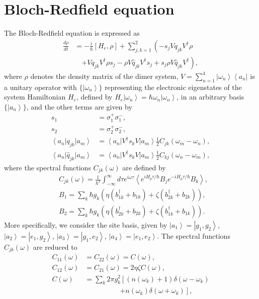 \documentclass[%
 reprint,%
 amssymb, amsmath,%
 aip,cha,%
]{revtex4-1}
\newcommand{\bra}[1]{\ensuremath{\left\langle{#1}\right\vert}}
\newcommand{\ket}[1]{\ensuremath{\left|{#1}\right\rangle}}
\begin{document}
\section{Bloch-Redfield equation}
 The Bloch-Redfield equation is expressed as
 \begin{align}
 \frac{d\rho}{dt}
 &=-\frac{i}{\hbar}[H_e,\rho]+\sum_{j,k=1}^{2}\left(-s_{j} V q_{jk} V^{\dagger} \rho\right.\label{eq:A1}\\
 &\quad\left.+V q_{jk} V^{\dagger} \rho s_{j} - \rho V \hat{q}_{jk} V^{\dagger} s_{j} + s_{j} \rho V \hat{q}_{jk} V^{\dagger}\right),\nonumber
 \end{align}
 where $\rho$ denotes the density matrix of the dimer system, $V=\sum_{n=1}^{4}\ket{\omega_n}\bra{a_n}$ is a unitary operator with $\{\ket{\omega_n}\}$ representing the electronic eigenstates of the system Hamiltonian $H_e$, defined by $H_e\ket{\omega_n}=\hbar\omega_n\ket{\omega_n}$, in an arbitrary basis $\{\ket{a_n}\}$, and the other terms are given by
 \begin{align}
s_{1}&=\sigma_{1}^{+}\sigma^-_{1},\\
s_{2}&=\sigma_{2}^{+}\sigma^-_{2},\\
\bra{a_n}q_{jk}\ket{a_m} &=\bra{a_n}V^{\dagger}s_{k} V\ket{a_m}\frac{1}{2}C_{jk}(\omega_m-\omega_n),\label{eq:A4}\\
\bra{a_n}\hat{q}_{jk}\ket{a_m} &=\bra{a_n}V^{\dagger}s_{k} V\ket{a_m}\frac{1}{2}C_{kj}(\omega_n-\omega_m),\label{eq:A5}
 \end{align}
 where the spectral functions $C_{jk}(\omega)$ are defined by
 \begin{align}
 &C_{jk}(\omega)=\frac{1}{\hbar^{2}}\int_{-\infty}^{\infty}d\tau e^{i\omega\tau}\left\langle e^{iH_{p}\tau/\hbar}B_{j}e^{-iH_{p}\tau/\hbar}B_{k} \right\rangle,\\
 &B_{1}=\sum_{k}\hbar g_{k}(\eta(b_{1k}^{\dagger}+b_{1k})+\zeta(b_{2k}^{\dagger}+b_{2k})),\\
 &B_{2}=\sum_{k}\hbar g_{k}(\eta(b_{2k}^{\dagger}+b_{2k})+\zeta(b_{1k}^{\dagger}+b_{1k})).
 \end{align}
 More specifically, we consider the site basis, given by $\ket{a_1}=\ket{g_1,g_2}$, $\ket{a_2}=\ket{e_1,g_2}$, $\ket{a_3}=\ket{g_1,e_2}$, $\ket{a_4}=\ket{e_1,e_2}$. The spectral functions $C_{jk}(\omega)$ are reduced to
 \begin{align}
 C_{11}(\omega)&=C_{22}(\omega)=C(\omega),\\
 C_{12}(\omega)&=C_{21}(\omega)=2\eta\zeta C(\omega),\\
 C(\omega)&=\sum_{k}2\pi g_{k}^{2}\left[(n(\omega_k)+1)\delta(\omega-\omega_k)\right.\\
 &\qquad\qquad\quad\left.+n(\omega_k)\delta(\omega+\omega_k)\right],\nonumber
 \end{align}
\end{document}
